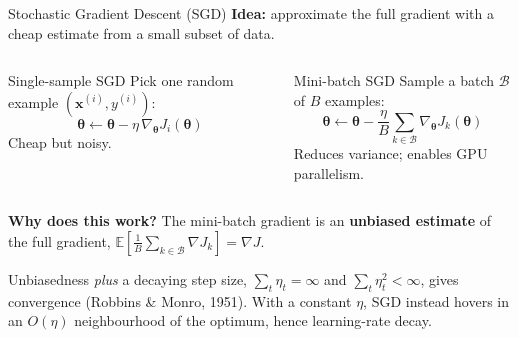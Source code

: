 \documentclass[aspectratio=169,11pt]{beamer}
\newcommand{\emphc}[1]{\textcolor{harvardcrimson}{#1}}
\newcommand{\x}{\bm{x}}
\newcommand{\E}[1]{\mathbb{E}\!\left[#1\right]}
\begin{document}
\begin{frame}{Stochastic Gradient Descent (SGD)}
\textbf{Idea:} approximate the full gradient with a cheap estimate from a small subset of data.

\vspace{0.1cm}
\begin{columns}[T]
\begin{block}{Single-sample SGD}
\small Pick one random example $(\x^{(i)},y^{(i)})$:
\[
    \bm{\theta} \leftarrow \bm{\theta} - \eta\,\nabla_{\!\bm{\theta}} J_i(\bm{\theta})
\]
Cheap but noisy.
\end{block}

\begin{block}{Mini-batch SGD}
\small Sample a batch $\mathcal{B}$ of $B$ examples:
\[
    \bm{\theta} \leftarrow \bm{\theta} - \frac{\eta}{B}\sum_{k\in\mathcal{B}} \nabla_{\!\bm{\theta}} J_k(\bm{\theta})
\]
Reduces variance; enables GPU parallelism.
\end{block}
\end{columns}

\vspace{0.15cm}
{\footnotesize\textbf{Why does this work?} The mini-batch gradient is an \textbf{unbiased estimate} of the full gradient, $\E{\tfrac{1}{B}\sum_{k\in\mathcal{B}}\nabla J_k} = \nabla J$.}

{\small Unbiasedness \emph{plus} a decaying step size, $\sum_t\eta_t=\infty$ and $\sum_t\eta_t^2<\infty$, gives convergence (Robbins \& Monro, 1951).  With a \emphc{constant} $\eta$, SGD instead hovers in an $O(\eta)$ neighbourhood of the optimum, hence learning-rate decay.}
\end{frame}
\end{document}
